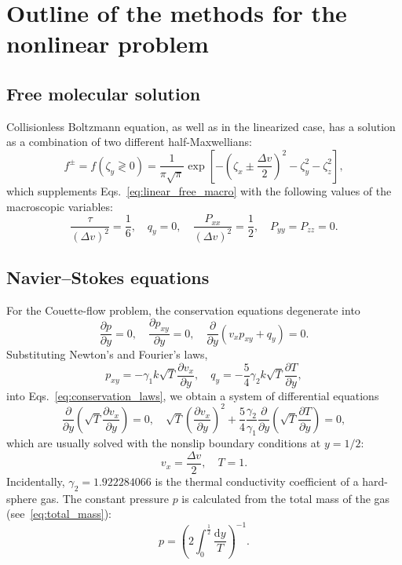 \documentclass[review]{elsarticle}
\newcommand{\dd}{\mathrm{d}}
\newcommand{\pder}[2][]{\frac{\partial#1}{\partial#2}}
\begin{document}
\section{Outline of the methods for the nonlinear problem}

\subsection{Free molecular solution}

Collisionless Boltzmann equation, as well as in the linearized case,
has a solution as a combination of two different half-Maxwellians:
\begin{equation}\label{eq:free_solution}
    f^\pm = f(\zeta_y \gtrless 0) =
        \frac1{\pi\sqrt{\pi}} \exp\left[-\left(\zeta_x\pm\frac{\Delta{v}}2\right)^2 - \zeta_y^2 - \zeta_z^2\right],
\end{equation}
which supplements Eqs.~\eqref{eq:linear_free_macro} with the following values of the macroscopic variables:
\begin{equation}\label{eq:free_macro}
    \frac{\tau}{(\Delta{v})^2} = \frac16, \quad q_y = 0, \quad
    \frac{P_{xx}}{(\Delta{v})^2} = \frac12, \quad P_{yy} = P_{zz} = 0.
\end{equation}

\subsection{Navier--Stokes equations}\label{sec:Navier-Stokes}

For the Couette-flow problem, the conservation equations degenerate into
\begin{equation}\label{eq:conservation_laws}
    \pder[p]{y} = 0, \quad \pder[p_{xy}]{y} = 0, \quad \pder{y}(v_x p_{xy} + q_y) = 0.
\end{equation}
Substituting Newton's and Fourier's laws,
\begin{equation}\label{eq:Newton-Fourier}
    p_{xy} = -\gamma_1 k\sqrt{T}\pder[v_x]{y}, \quad q_y = -\frac54\gamma_2 k\sqrt{T}\pder[T]{y},
\end{equation}
into Eqs.~\eqref{eq:conservation_laws}, we obtain a system of differential equations
\begin{equation}\label{eq:Navier-Stokes}
    \pder{y}\left(\sqrt{T}\pder[v_x]{y}\right) = 0, \quad
    \sqrt{T}\left(\pder[v_x]{y}\right)^2 + \frac54\frac{\gamma_2}{\gamma_1}\pder{y}\left(\sqrt{T}\pder[T]{y}\right) = 0,
\end{equation}
which are usually solved with the nonslip boundary conditions at \(y=1/2\):
\begin{equation}\label{eq:nonslip_bc}
    v_x = \frac{\Delta{v}}2, \quad T = 1.
\end{equation}
Incidentally, \(\gamma_2 = 1.922284066\) is the thermal conductivity coefficient of a hard-sphere gas.
The constant pressure \(p\) is calculated from the total mass of the gas (see~\eqref{eq:total_mass}):
\begin{equation}\label{eq:constant_pressure}
    p = \left( 2\int_{0}^\frac12\frac{\dd{y}}{T} \right)^{-1}.
\end{equation}
\end{document}
